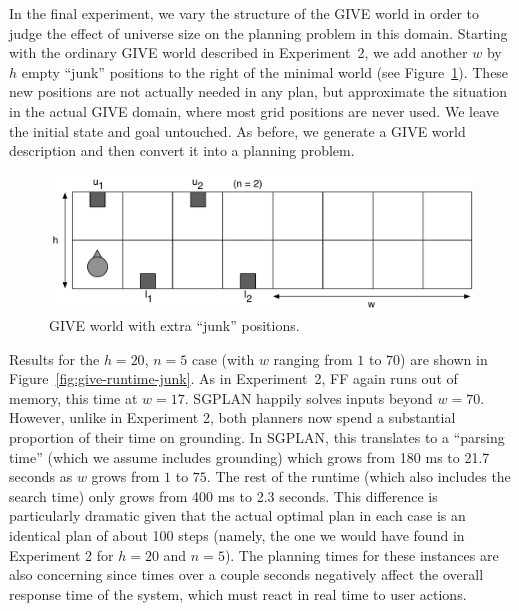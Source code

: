 In the final experiment, we vary the structure of the GIVE world in order
to judge the effect of universe size on the planning problem in this
domain.  Starting with the ordinary GIVE world described in Experiment~2,
we add another $w$ by $h$ empty ``junk'' positions to the right of the
minimal world (see Figure~\ref{fig:give-junk}). These new positions are not
actually needed in any plan, but approximate the situation in the actual
GIVE domain, where most grid positions are never used. We leave the initial
state and goal untouched. As before, we generate a GIVE world description
and then convert it into a planning problem.

\begin{figure}
  \centering
  \includegraphics[width=1\columnwidth]{pic-empty-buttons}
  \caption{GIVE world with extra ``junk'' positions.}
  \label{fig:give-junk}
\end{figure}

Results for the $h=20$, $n=5$ case (with $w$ ranging from $1$ to $70$)
are shown in Figure~\ref{fig:give-runtime-junk}. As in Experiment~2,
FF again runs out of memory, this time at $w=17$. SGPLAN happily
solves inputs beyond $w=70$. However, unlike in Experiment 2, both
planners now spend a substantial proportion of their time on
grounding. In SGPLAN, this translates to a ``parsing time'' (which we
assume includes grounding) which grows from 180 ms to 21.7 seconds as
$w$ grows from $1$ to $75$. The rest of the runtime (which also
includes the search time) only grows from 400 ms to 2.3 seconds. This
difference is particularly dramatic given that the actual optimal plan
in each case is an identical plan of about 100 steps (namely, the one
we would have found in Experiment 2 for $h=20$ and $n=5$). The
planning times for these instances are also concerning since times
over a couple seconds negatively affect the overall response time of
the system, which must react in real time to user actions.

